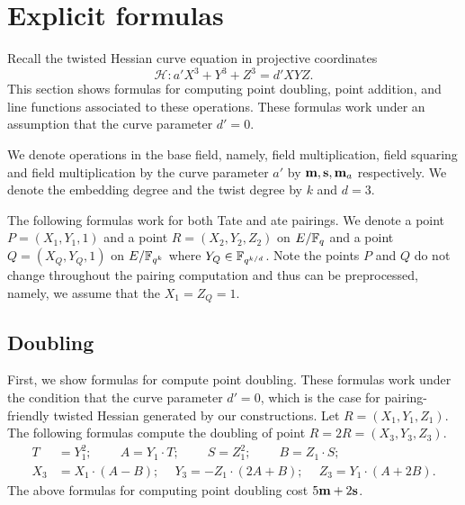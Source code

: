 \section{Explicit formulas}
\label{sec:formulas}

Recall the twisted Hessian curve equation in projective coordinates
$$ \mathcal{H}: a' X^3 + Y^3 + Z^3 = d' X Y Z. $$
This section shows formulas for computing point doubling, point addition,
and line functions associated to these operations.
These formulas work under an assumption that the curve parameter $d' = 0$.

We denote operations in the base field, namely, 
field multiplication, field squaring and field multiplication by the curve parameter $a'$
by $\textbf{m}, \textbf{s}, \textbf{m}_{a}$ respectively.
We denote the embedding degree and the twist degree by $k$ and $d=3$.

The following formulas work for both Tate and ate pairings.
We denote a point $P = (X_1,Y_1,1)$ and a point $R = (X_2,Y_2,Z_2)$ on $E/\mathbb{F}_{q}$
and a point $Q = (X_{Q},Y_{Q},1)$ on $E/\mathbb{F}_{q^{k}}$ where $Y_Q \in \mathbb{F}_{q^{k/d}}$.
Note the points $P$ and $Q$ do not change throughout the pairing computation and thus can be preprocessed,
namely, we assume that the $X_1 = Z_{Q} = 1$.


\subsection{Doubling}
First, we show formulas for compute point doubling.
These formulas work under the condition that the curve parameter $d'=0$,
which is the case for pairing-friendly twisted Hessian generated by our constructions.
Let $R = (X_1, Y_1, Z_1)$.
The following formulas compute the doubling of point $R = 2R = (X_3,Y_3,Z_3)$.
\begin{align*}
T &= Y_1^2;\	\qquad	A = Y_1 \cdot T;\	\qquad
S = Z_1 ^ 2;\	\qquad	B = Z_1 \cdot S;\\
X_3 &= X_1 \cdot (A - B);\	\quad
Y_3 = -Z_1 \cdot (2A + B);\	\quad
Z_3 = Y_1 \cdot (A + 2B).
\end{align*}
The above formulas for computing point doubling
cost $5\textbf{m} + 2\textbf{s}$. %

